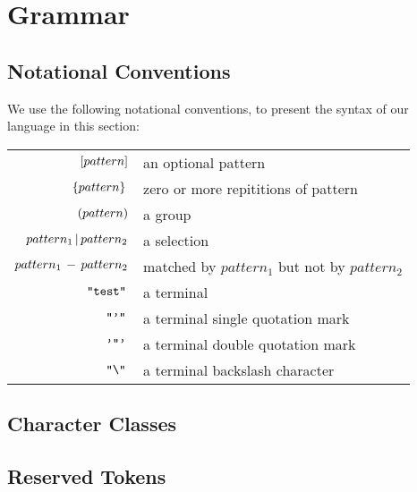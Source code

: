 \section{Grammar}

\subsection{Notational Conventions}
We use the following notational conventions, to present the
syntax of our language in this section:

\begin{center}
\begin{tabular}{r l}
  $[pattern]$ & an optional pattern \\
  $\,\{pattern\}\,$ & zero or more repititions of pattern \\
  $(pattern)$ & a group \\
  $pattern_1 \,|\, pattern_2$ & a selection \\
  $pattern_1 \, - \, pattern_2$ & matched by $pattern_1$ but not by $pattern_2$\\
  $\, \texttt{"test"} \,$ & a terminal \\
  $\,\texttt{"'"}\,$ & a terminal single quotation mark \\
  $\,\texttt{'"'}\,$ & a terminal double quotation mark \\
  $\,\texttt{"\textbackslash"}\,$ & a terminal backslash character \\
\end{tabular}
\end{center}

\subsection{Character Classes}
\begin{ebnf}
\end{ebnf}
\subsection{Reserved Tokens}
\begin{ebnf}
\end{ebnf}

